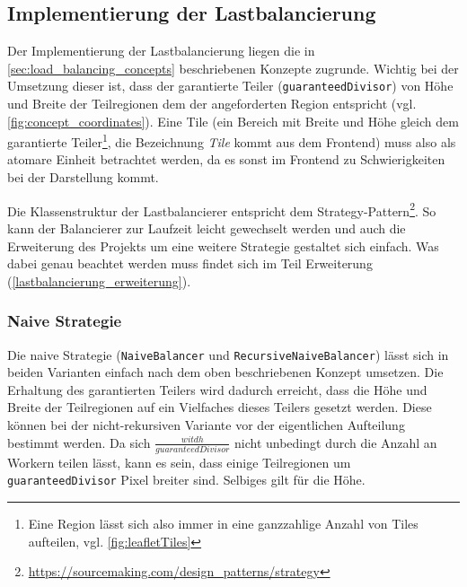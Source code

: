 \begin{figure}
	
\end{figure}

\subsection{Implementierung der Lastbalancierung}\label{sec:load_balancing}
Der Implementierung der Lastbalancierung liegen die in \autoref{sec:load_balancing_concepts} beschriebenen Konzepte zugrunde.
Wichtig bei der Umsetzung dieser ist, dass der garantierte Teiler (\verb|guaranteedDivisor|) von Höhe und Breite der Teilregionen dem der angeforderten Region entspricht (vgl. \autoref{fig:concept_coordinates}).
Eine Tile (ein Bereich mit Breite und Höhe gleich dem garantierte Teiler\footnote{Eine Region lässt sich also immer in eine ganzzahlige Anzahl von Tiles aufteilen, vgl. \autoref{fig:leafletTiles}}, die Bezeichnung \textit{Tile} kommt aus dem Frontend) muss also als atomare Einheit betrachtet werden, da es sonst im Frontend zu Schwierigkeiten bei der Darstellung kommt.

Die Klassenstruktur der Lastbalancierer entspricht dem Strategy-Pattern\footnote{\url{https://sourcemaking.com/design_patterns/strategy}}. So kann der Balancierer zur Laufzeit leicht gewechselt werden und auch die Erweiterung des Projekts um eine weitere Strategie gestaltet sich einfach.
Was dabei genau beachtet werden muss findet sich im Teil Erweiterung (\ref{lastbalancierung_erweiterung}).

\subsubsection{Naive Strategie}

Die naive Strategie (\verb|NaiveBalancer| und \verb|RecursiveNaiveBalancer|) lässt sich in beiden Varianten einfach nach dem oben beschriebenen Konzept umsetzen.
Die Erhaltung des garantierten Teilers wird dadurch erreicht, dass die Höhe und Breite der Teilregionen auf ein Vielfaches dieses Teilers gesetzt werden.
Diese können bei der nicht-rekursiven Variante vor der eigentlichen Aufteilung bestimmt werden.
Da sich $\frac{witdh}{guaranteedDivisor}$ nicht unbedingt durch die Anzahl an Workern teilen lässt, kann es sein, dass einige Teilregionen um \verb|guaranteedDivisor| Pixel breiter sind.
Selbiges gilt für die Höhe.

